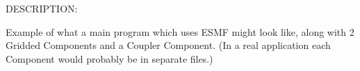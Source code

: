  
\setlength{\oldparskip}{\parskip}
\setlength{\parskip}{1.5ex}
\setlength{\oldparindent}{\parindent}
\setlength{\parindent}{0pt}
\setlength{\oldbaselineskip}{\baselineskip}
\setlength{\baselineskip}{11pt}
 
\def\bv{\begin{verbatim}}
\def\ev{\end{verbatim}}
\def\be{\begin{equation}}
\def\ee{\end{equation}}
\def\bea{\begin{eqnarray}}
\def\eea{\end{eqnarray}}
\def\bi{\begin{itemize}}
\def\ei{\end{itemize}}
\def\bn{\begin{enumerate}}
\def\en{\end{enumerate}}
\def\bd{\begin{description}}
\def\ed{\end{description}}
\def\({\left (}
\def\){\right )}
\def\[{\left [}
\def\]{\right ]}
\def\<{\left  \langle}
\def\>{\right \rangle}
\def\cI{{\cal I}}
\def\diag{\mathop{\rm diag}}
\def\tr{\mathop{\rm tr}}


 

  
{\sf DESCRIPTION:\\ }


   Example of what a main program which uses ESMF might look like, along
    with 2 Gridded Components and a Coupler Component.  
    (In a real application each Component would probably be in separate files.)
   

